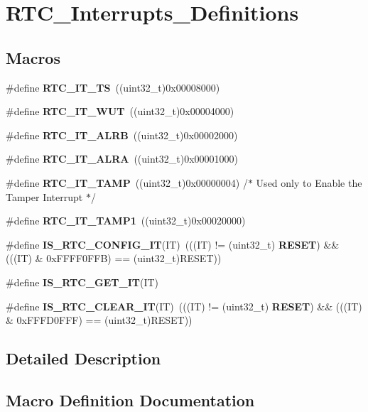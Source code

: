\section{R\+T\+C\+\_\+\+Interrupts\+\_\+\+Definitions}
\label{group__RTC__Interrupts__Definitions}
\subsection*{Macros}
\begin{DoxyCompactItemize}
\item 
\#define \textbf{ R\+T\+C\+\_\+\+I\+T\+\_\+\+TS}~((uint32\+\_\+t)0x00008000)
\item 
\#define \textbf{ R\+T\+C\+\_\+\+I\+T\+\_\+\+W\+UT}~((uint32\+\_\+t)0x00004000)
\item 
\#define \textbf{ R\+T\+C\+\_\+\+I\+T\+\_\+\+A\+L\+RB}~((uint32\+\_\+t)0x00002000)
\item 
\#define \textbf{ R\+T\+C\+\_\+\+I\+T\+\_\+\+A\+L\+RA}~((uint32\+\_\+t)0x00001000)
\item 
\#define \textbf{ R\+T\+C\+\_\+\+I\+T\+\_\+\+T\+A\+MP}~((uint32\+\_\+t)0x00000004) /$\ast$ Used only to Enable the Tamper Interrupt $\ast$/
\item 
\#define \textbf{ R\+T\+C\+\_\+\+I\+T\+\_\+\+T\+A\+M\+P1}~((uint32\+\_\+t)0x00020000)
\item 
\#define \textbf{ I\+S\+\_\+\+R\+T\+C\+\_\+\+C\+O\+N\+F\+I\+G\+\_\+\+IT}(IT)~(((IT) != (uint32\+\_\+t)\textbf{ R\+E\+S\+ET}) \&\& (((IT) \& 0x\+F\+F\+F\+F0\+F\+F\+B) == (uint32\+\_\+t)\+R\+E\+S\+E\+T))
\item 
\#define \textbf{ I\+S\+\_\+\+R\+T\+C\+\_\+\+G\+E\+T\+\_\+\+IT}(IT)
\item 
\#define \textbf{ I\+S\+\_\+\+R\+T\+C\+\_\+\+C\+L\+E\+A\+R\+\_\+\+IT}(IT)~(((IT) != (uint32\+\_\+t)\textbf{ R\+E\+S\+ET}) \&\& (((IT) \& 0x\+F\+F\+F\+D0\+F\+F\+F) == (uint32\+\_\+t)\+R\+E\+S\+E\+T))
\end{DoxyCompactItemize}


\subsection{Detailed Description}


\subsection{Macro Definition Documentation}
\mbox{\label{group__RTC__Interrupts__Definitions_ga1289cb21107c648b293aee4a4f8cba70}} 
